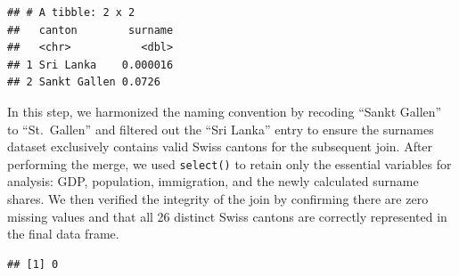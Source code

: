 \documentclass[
]{article}
\newenvironment{Shaded}{\begin{snugshade}}{\end{snugshade}}
\newcommand{\AttributeTok}[1]{\textcolor[rgb]{0.13,0.29,0.53}{#1}}
\newcommand{\CommentTok}[1]{\textcolor[rgb]{0.56,0.35,0.01}{\textit{#1}}}
\newcommand{\FunctionTok}[1]{\textcolor[rgb]{0.13,0.29,0.53}{\textbf{#1}}}
\newcommand{\NormalTok}[1]{#1}
\newcommand{\OtherTok}[1]{\textcolor[rgb]{0.56,0.35,0.01}{#1}}
\newcommand{\SpecialCharTok}[1]{\textcolor[rgb]{0.81,0.36,0.00}{\textbf{#1}}}
\newcommand{\StringTok}[1]{\textcolor[rgb]{0.31,0.60,0.02}{#1}}
\begin{document}
\begin{verbatim}
## # A tibble: 2 x 2
##   canton        surname
##   <chr>           <dbl>
## 1 Sri Lanka    0.000016
## 2 Sankt Gallen 0.0726
\end{verbatim}

In this step, we harmonized the naming convention by recoding ``Sankt
Gallen'' to ``St.~Gallen'' and filtered out the ``Sri Lanka'' entry to
ensure the surnames dataset exclusively contains valid Swiss cantons for
the subsequent join. After performing the merge, we used
\texttt{select()} to retain only the essential variables for analysis:
GDP, population, immigration, and the newly calculated surname shares.
We then verified the integrity of the join by confirming there are zero
missing values and that all 26 distinct Swiss cantons are correctly
represented in the final data frame.

\begin{Shaded}
\end{Shaded}

\begin{verbatim}
## [1] 0
\end{verbatim}

\begin{Shaded}
\end{Shaded}
\end{document}
